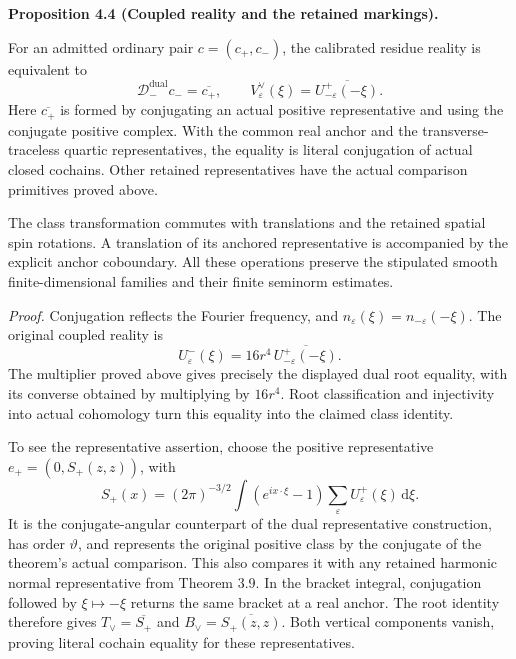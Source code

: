 \documentclass[
  english,
  11pt,
  reqno]{amsart}
\makeatletter
\newcommand{\pandocstatementheading}[1]{%
  \par\if@nobreak\else
    \addpenalty{\@beginparpenalty}%
    \addvspace{.5\baselineskip plus .2\baselineskip minus .2\baselineskip}%
  \fi
  {\normalfont\bfseries #1\par}%
  \nobreak\@afterindenttrue\@afterheading
}
\makeatother
\begin{document}
\pandocstatementheading{\leavevmode{}\label{prop:online-negative-dual-reality-and-markings}Proposition 4.4 (Coupled reality and the retained markings).}

For an admitted ordinary pair \(c=(c_+,c_-)\), the calibrated residue
reality is equivalent to%
 \[
\mathcal D_-^{\mathrm{dual}}c_-=\overline{c_+},
\qquad
V^\vee_\varepsilon(\xi)
=\overline{U^+_{-\varepsilon}(-\xi)} .
\] Here \(\overline{c_+}\) is formed by conjugating an actual positive
representative and using the conjugate positive complex. With the common
real anchor and the transverse-traceless quartic representatives, the
equality is literal conjugation of actual closed cochains. Other
retained representatives have the actual comparison primitives proved
above.

The class transformation commutes with translations and the retained
spatial spin rotations. A translation of its anchored representative is
accompanied by the explicit anchor coboundary. All these operations
preserve the stipulated smooth finite-dimensional families and their
finite seminorm estimates.

\emph{Proof.} Conjugation reflects the Fourier frequency, and
\(n_\varepsilon(\xi)=n_{-\varepsilon}(-\xi)\). The original coupled
reality is \[
U^-_\varepsilon(\xi)
=16r^4\,\overline{U^+_{-\varepsilon}(-\xi)}.
\] The multiplier proved above gives precisely the displayed dual root
equality, with its converse obtained by multiplying by \(16r^4\). Root
classification and injectivity into actual cohomology turn this equality
into the claimed class identity.

To see the representative assertion, choose the positive representative
\(e_+=(0,S_+(z,z))\), with%
 \[
S_+(x)=(2\pi)^{-3/2}\int
(e^{ix\cdot\xi}-1)\sum_\varepsilon U^+_\varepsilon(\xi)
\,\mathrm d\xi .
\] It is the conjugate-angular counterpart of the dual representative
construction, has order \(\vartheta\), and represents the original
positive class by the conjugate of the theorem's actual comparison. This
also compares it with any retained harmonic normal representative from
Theorem 3.9. In the bracket integral, conjugation followed by
\(\xi\mapsto-\xi\) returns the same bracket at a real anchor. The root
identity therefore gives \(T_\vee=\overline{S_+}\) and
\(B_\vee=\overline{S_+(z,z)}\). Both vertical components vanish, proving
literal cochain equality for these representatives.
\end{document}
